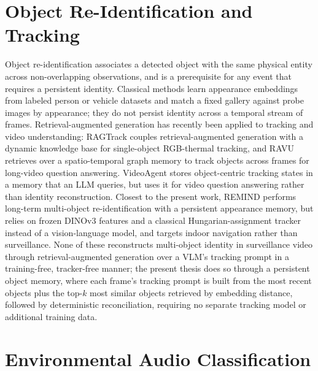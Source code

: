 \section{Object Re-Identification and Tracking}

Object re-identification associates a detected object with the same physical entity across non-overlapping observations, and is a prerequisite for any event that requires a persistent identity. Classical methods learn appearance embeddings from labeled person or vehicle datasets and match a fixed gallery against probe images by appearance; they do not persist identity across a temporal stream of frames. Retrieval-augmented generation has recently been applied to tracking and video understanding: RAGTrack \citep{li2026ragtrack} couples retrieval-augmented generation with a dynamic knowledge base for single-object RGB-thermal tracking, and RAVU \citep{malik2025ravu} retrieves over a spatio-temporal graph memory to track objects across frames for long-video question answering. VideoAgent \citep{fan2024videoagent} stores object-centric tracking states in a memory that an LLM queries, but uses it for video question answering rather than identity reconstruction. Closest to the present work, REMIND \citep{diazpereda2026remind} performs long-term multi-object re-identification with a persistent appearance memory, but relies on frozen DINOv3 features and a classical Hungarian-assignment tracker instead of a vision-language model, and targets indoor navigation rather than surveillance. None of these reconstructs multi-object identity in surveillance video through retrieval-augmented generation over a VLM's tracking prompt in a training-free, tracker-free manner; the present thesis does so through a persistent object memory, where each frame's tracking prompt is built from the most recent objects plus the top-$k$ most similar objects retrieved by embedding distance, followed by deterministic reconciliation, requiring no separate tracking model or additional training data.

\section{Environmental Audio Classification}

